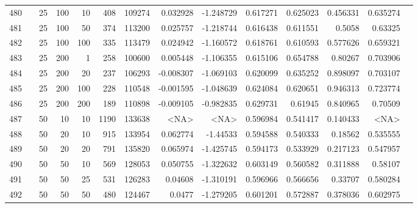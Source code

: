 \begin{longtable}{llrrrrrrrrrrrr}
		480 & &           25 &               100 &           10 &          408 &     109274 &  0.032928 & -1.248729 &  0.617271 &    0.625023 &       0.456331 &  0.635274 \\
		481 & &           25 &               100 &           50 &          374 &     113200 &  0.025757 & -1.218744 &  0.616438 &    0.611551 &         0.5058 &   0.63325 \\
		482 & &           25 &               100 &          100 &          335 &     113479 &  0.024942 & -1.160572 &  0.618761 &    0.610593 &       0.577626 &  0.659321 \\
		483 & &           25 &               200 &            1 &          258 &     100600 &  0.005448 & -1.106355 &  0.615106 &    0.654788 &        0.80267 &  0.703906 \\
		484 & &           25 &               200 &           20 &          237 &     106293 & -0.008307 & -1.069103 &  0.620099 &    0.635252 &       0.898097 &  0.703107 \\
		485 & &           25 &               200 &          100 &          228 &     110548 & -0.001595 & -1.048639 &  0.624084 &    0.620651 &       0.946313 &  0.723774 \\
		486 & &           25 &               200 &          200 &          189 &     110898 & -0.009105 & -0.982835 &  0.629731 &     0.61945 &       0.840965 &   0.70509 \\
		487 & &           50 &                10 &           10 &           1190 &     133638 &      <NA> &      <NA> &  0.596984 &    0.541417 &       0.140433 &  <NA> \\
		488 & &           50 &                20 &           10 &          915 &     133954 &  0.062774 &  -1.44533 &  0.594588 &    0.540333 &        0.18562 &  0.535555 \\
		489 & &           50 &                20 &           20 &          791 &     135820 &  0.065974 & -1.425745 &  0.594173 &    0.533929 &       0.217123 &  0.547957 \\
		490 & &           50 &                50 &           10 &          569 &     128053 &  0.050755 & -1.322632 &  0.603149 &    0.560582 &       0.311888 &   0.58107 \\
		491 & \multirow[b]{10}{*}{\rotatebox[origin=l]{90}{tfidf-spacy}} &           50 &                50 &           25 &          531 &     126283 &   0.04608 & -1.310191 &  0.596966 &    0.566656 &        0.33707 &  0.580284 \\
		492 & &           50 &                50 &           50 &          480 &     124467 &    0.0477 & -1.279205 &  0.601201 &    0.572887 &       0.378036 &  0.602975 \\

\end{longtable}
